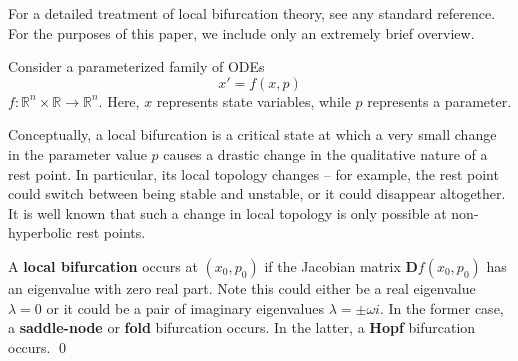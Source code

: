 For a detailed treatment of local bifurcation theory, see any standard reference. For the purposes of this paper, we include only an extremely brief overview. 

Consider a parameterized family of ODEs
%
\begin{equation}
	x' = f(x, p)
\end{equation}
%
$f: \mathbb{R}^n \times \mathbb{R} \to \mathbb{R}^n$. Here, $x$ represents state variables, while $p$ represents a parameter. 

%

Conceptually, a local bifurcation is a critical state at which a very small change in the parameter value $p$ causes a drastic change in the qualitative nature of a rest point. In particular, its local topology changes -- for example, the rest point could switch between being stable and unstable, or it could disappear altogether. It is well known that such a change in local topology is only possible at non-hyperbolic rest points. 

\begin{definition}
	A \textbf{local bifurcation} occurs at ${\displaystyle (x_{0}, p_{0})}$ if the Jacobian matrix ${\displaystyle {\mathbf{D}f(x_{0},p _{0})}}$ has an eigenvalue with zero real part. Note this could either be a real eigenvalue $\lambda = 0$ or it could be a pair of imaginary eigenvalues $\lambda = \pm \omega i$. In the former case, a \textbf{saddle-node} or \textbf{fold} bifurcation occurs. In the latter, a \textbf{Hopf} bifurcation occurs. \qed
\end{definition}

